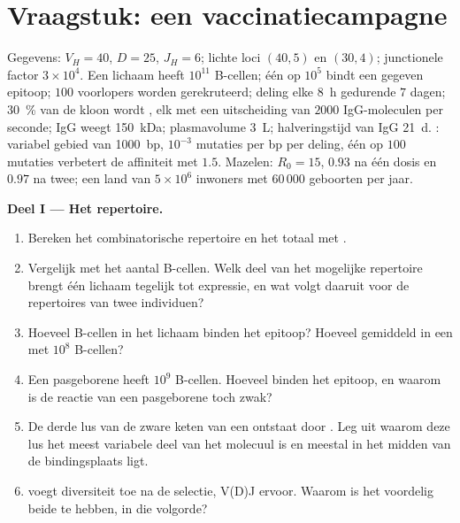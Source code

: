 \section{Vraagstuk: een vaccinatiecampagne}

\begin{problem}
\label{pb:b3:adaptive-immunity:1}
Gegevens: $V_{H} = 40$, $D = 25$, $J_{H} = 6$; lichte loci $(40, 5)$ en
$(30, 4)$; junctionele factor $3\times 10^{4}$. Een lichaam heeft
$10^{11}$ B-cellen; één op $10^{5}$ bindt een gegeven epitoop; $100$
voorlopers worden gerekruteerd; deling elke \qty{8}{h} gedurende $7$
dagen; \qty{30}{\%} van de kloon wordt , elk met een
uitscheiding van $2000$ IgG-moleculen per seconde; IgG weegt
\qty{150}{kDa}; plasmavolume \qty{3}{L}; halveringstijd van IgG
\qty{21}{d}. : variabel gebied van \qty{1000}{bp}, $10^{-3}$
mutaties per bp per deling, één op $100$ mutaties verbetert de
affiniteit met $1.5$. Mazelen: $R_{0} = 15$,  $0.93$
na één dosis en $0.97$ na twee; een land van $5\times 10^{6}$ inwoners
met $60\,000$ geboorten per jaar.

\medskip
\noindent\textbf{Deel I --- Het repertoire.}
\begin{enumerate}
  \item Bereken het combinatorische repertoire en het totaal met
        .
  \item Vergelijk met het aantal B-cellen. Welk deel van het mogelijke
        repertoire brengt één lichaam tegelijk tot expressie, en wat
        volgt daaruit voor de repertoires van twee individuen?
  \item Hoeveel B-cellen in het lichaam binden het epitoop? Hoeveel
        gemiddeld in een  met $10^{8}$ B-cellen?
  \item Een pasgeborene heeft $10^{9}$ B-cellen. Hoeveel binden het
        epitoop, en waarom is de reactie van een pasgeborene toch zwak?
  \item De derde lus van de zware keten van een  ontstaat
        door . Leg uit waarom deze lus het meest
        variabele deel van het molecuul is en meestal in het midden van
        de bindingsplaats ligt.
  \item {} voegt diversiteit toe na de selectie,
        V(D)J ervoor. Waarom is het voordelig beide te hebben, in die
        volgorde?
\end{enumerate}


\end{problem}
